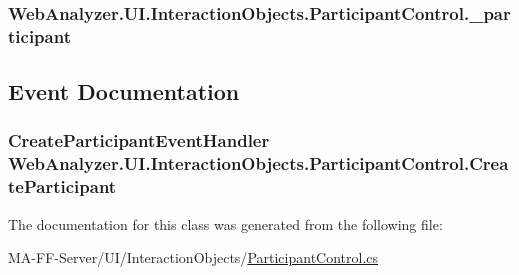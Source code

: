 \subsubsection[{\+\_\+participant}]{ Web\+Analyzer.\+U\+I.\+Interaction\+Objects.\+Participant\+Control.\+\_\+participant\hspace{0.3cm}{\ttfamily [private]}}\label{class_web_analyzer_1_1_u_i_1_1_interaction_objects_1_1_participant_control_ae7f805fadde2e1d9088c751bc5860b94}


\subsection{Event Documentation}
\hypertarget{class_web_analyzer_1_1_u_i_1_1_interaction_objects_1_1_participant_control_a05567dca7355e947bf348985f4227d36}{}
\subsubsection[{Create\+Participant}]{\setlength{\rightskip}{0pt plus 5cm}Create\+Participant\+Event\+Handler Web\+Analyzer.\+U\+I.\+Interaction\+Objects.\+Participant\+Control.\+Create\+Participant}\label{class_web_analyzer_1_1_u_i_1_1_interaction_objects_1_1_participant_control_a05567dca7355e947bf348985f4227d36}


The documentation for this class was generated from the following file\+:\begin{DoxyCompactItemize}
\item 
M\+A-\/\+F\+F-\/\+Server/\+U\+I/\+Interaction\+Objects/\hyperlink{_participant_control_8cs}{Participant\+Control.\+cs}\end{DoxyCompactItemize}
